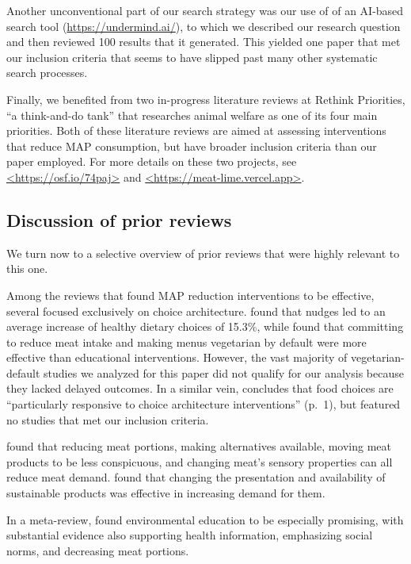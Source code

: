 \documentclass[sn-nature,referee,pdflatex]{sn-jnl}
\begin{document}
Another unconventional part of our search strategy was our use of of an
AI-based search tool (\url{https://undermind.ai/}), to which we
described our research question and then reviewed 100 results that it
generated. This yielded one paper that met our inclusion criteria
\citep{mattson2020} that seems to have slipped past many other
systematic search processes.

Finally, we benefited from two in-progress literature reviews at Rethink
Priorities, ``a think-and-do tank'' that researches animal welfare as
one of its four main priorities. Both of these literature reviews are
aimed at assessing interventions that reduce MAP consumption, but have
broader inclusion criteria than our paper employed. For more details on
these two projects, see \url{<https://osf.io/74paj>} and
\url{<https://meat-lime.vercel.app>}.

\subsection{Discussion of prior
reviews}\label{discussion-of-prior-reviews}

We turn now to a selective overview of prior reviews that were highly
relevant to this one.

Among the reviews that found MAP reduction interventions to be
effective, several focused exclusively on choice architecture.
\citep{arno2016} found that nudges led to an average increase of healthy
dietary choices of 15.3\%, while \citep{byerly2018} found that
committing to reduce meat intake and making menus vegetarian by default
were more effective than educational interventions. However, the vast
majority of vegetarian-default studies we analyzed for this paper did
not qualify for our analysis because they lacked delayed outcomes. In a
similar vein, \citep{mertens2022} concludes that food choices are
``particularly responsive to choice architecture interventions'' (p.~1),
but featured no studies that met our inclusion criteria.

\citep{bianchi2018restructuring} found that reducing meat portions,
making alternatives available, moving meat products to be less
conspicuous, and changing meat's sensory properties can all reduce meat
demand. \citep{pandey2023} found that changing the presentation and
availability of sustainable products was effective in increasing demand
for them.

In a meta-review, \citep{grundy2022} found environmental education to be
especially promising, with substantial evidence also supporting health
information, emphasizing social norms, and decreasing meat portions.
\end{document}
